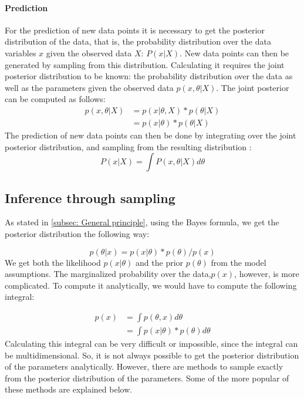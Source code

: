 \documentclass{article}
\begin{document}
\paragraph{Prediction}
For the prediction of new data points it is necessary to get the posterior distribution of the data, that is, the probability distribution over the data variables $x$ given the observed data $X$: $P(x|X)$. New data points can then be generated by sampling from this distribution. Calculating it requires the joint posterior distribution to be known: the probability distribution over the data as well as the parameters given the observed data $p(x,\theta|X)$. The joint posterior can be computed as follows:
\begin{equation}
\begin{aligned}
p(x,\theta|X) &	= p(x|\theta,X) * p(\theta|X) \\
 			& = p(x|\theta) * p(\theta|X)
\end{aligned}
\end{equation}
The prediction of new data points can then be done by integrating over the joint posterior distribution, and sampling from the resulting distribution \cite{1439840954}:
\begin{equation}
P(x|X) = \int P(x,\theta|X) d\theta
\end{equation}

\subsection{Inference through sampling}
\label{subsec:sampling}
As stated in \ref{subsec: General principle}, using the Bayes formula, we get the posterior distribution the following way:

\begin{equation}
p(\theta|x) = p(x|\theta) * p(\theta) / p(x)
\end{equation}
We get both the likelihood $p(x|\theta)$ and the prior $p(\theta)$ from the model assumptions. The marginalized probability over the data,$p(x)$, however, is more complicated. To compute it analytically, we would have to compute the following integral:

\begin{equation}
\begin{split}
p(x) &= \int p(\theta,x) d \theta \\
&=  \int p(x|\theta) * p(\theta) d \theta
\end{split}
\end{equation}
Calculating this integral can be very difficult or impossible, since the integral can be multidimensional. So, it is not always possible to get the posterior distribution of the parameters analytically. However, there are methods to sample exactly from the posterior distribution of the parameters. Some of the more popular of these methods are explained below.
\end{document}
